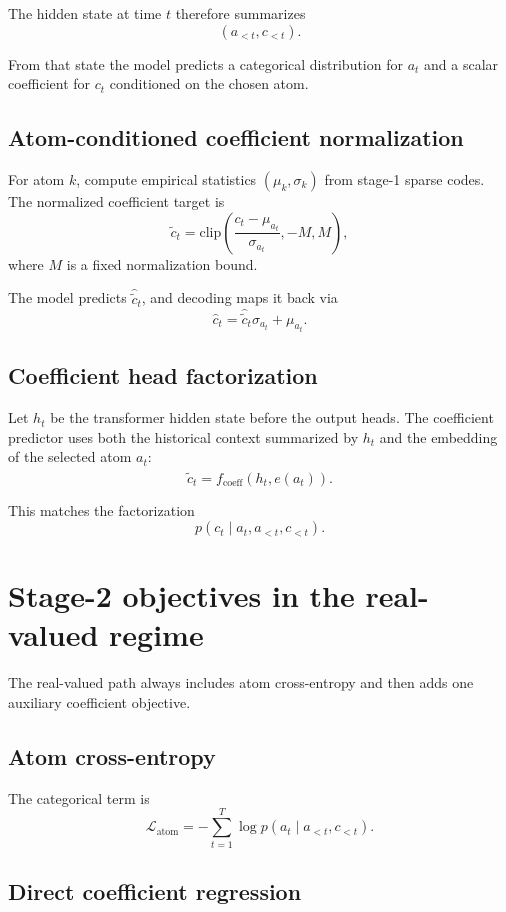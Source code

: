 \documentclass[11pt]{article}
\begin{document}
The hidden state at time $t$ therefore summarizes
\[
(a_{<t}, c_{<t}).
\]

From that state the model predicts a categorical distribution for $a_t$ and a scalar coefficient for $c_t$ conditioned on the chosen atom.

\subsection{Atom-conditioned coefficient normalization}

For atom $k$, compute empirical statistics $(\mu_k, \sigma_k)$ from stage-1 sparse codes. The normalized coefficient target is
\[
\tilde c_t
=
\mathrm{clip}
\left(
\frac{c_t - \mu_{a_t}}{\sigma_{a_t}},
-M,
M
\right),
\]
where $M$ is a fixed normalization bound.

The model predicts $\hat{\tilde c}_t$, and decoding maps it back via
\[
\hat c_t
=
\hat{\tilde c}_t \sigma_{a_t} + \mu_{a_t}.
\]

\subsection{Coefficient head factorization}

Let $h_t$ be the transformer hidden state before the output heads. The coefficient predictor uses both the historical context summarized by $h_t$ and the embedding of the selected atom $a_t$:
\[
\hat{\tilde c}_t = f_{\text{coeff}}(h_t, e(a_t)).
\]

This matches the factorization
\[
p(c_t \mid a_t, a_{<t}, c_{<t}).
\]

\section{Stage-2 objectives in the real-valued regime}

The real-valued path always includes atom cross-entropy and then adds one auxiliary coefficient objective.

\subsection{Atom cross-entropy}

The categorical term is
\[
\mathcal{L}_{\text{atom}}
=
-
\sum_{t=1}^{T} \log p(a_t \mid a_{<t}, c_{<t}).
\]

\subsection{Direct coefficient regression}
\end{document}
